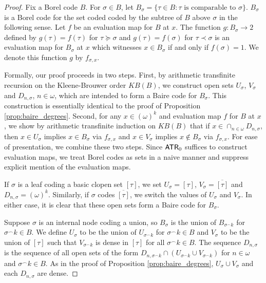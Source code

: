 \documentclass{amsart}
\theoremstyle{definition}
\theoremstyle{remark}
\newcommand{\system}[1]{\mbox{\fontfamily{cmss}\fontshape{n}\fontseries{m}%
    \selectfont#1}}
\newcommand{\ATR}{\system{ATR}\ensuremath{_0}}
\begin{document}
\begin{proof}
Fix a Borel code $B$. For $\sigma \in B$, let 
$B_{\sigma} = \{ \tau \in B : \tau \text{ is comparable to } \sigma \}$. $B_{\sigma}$ is a Borel code for the set coded coded by the subtree of $B$ above $\sigma$ in the 
following sense. Let $f$ be an evaluation map for $B$ at $x$. The function $g: B_{\sigma} \rightarrow 2$ defined by $g(\tau) = f(\tau)$ for $\tau \succeq \sigma$ and 
$g(\tau) = f(\sigma)$ for $\tau \prec \sigma$ is an evaluation map for $B_{\sigma}$ at $x$ which witnesses $x \in B_{\sigma}$ if and only if $f(\sigma) = 1$. We 
denote this function $g$ by $f_{\sigma,x}$. 

Formally, our proof proceeds in two steps. First, by arithmetic transfinite recursion on the Kleene-Brouwer order $KB(B)$, we construct 
open sets $U_{\sigma}$, $V_{\sigma}$ and $D_{n,\sigma}$, $n \in \omega$, which are intended to form a Baire code for $B_{\sigma}$. This construction is essentially identical 
to the proof of Proposition \ref{prop:baire_degrees}. Second, for any $x \in (\omega)^k$ 
and evaluation map $f$ for $B$ at $x$, we show by arithmetic transfinite induction on $KB(B)$ that if $x \in \cap_{n \in \omega} D_{n,\sigma}$, then $x \in U_{\sigma}$ implies 
$x \in B_{\sigma}$ via $f_{\sigma,x}$ and $x \in V_{\sigma}$ implies $x \not \in B_{\sigma}$ via $f_{\sigma,x}$. For ease of presentation, we combine these two steps.  
Since $\ATR$ suffices to construct evaluation maps, we treat Borel codes as sets in a naive manner and suppress explicit mention of the evaluation maps.

If $\sigma$ is a leaf coding a basic clopen set $[\tau]$, we set $U_{\sigma} = [\tau]$, $V_{\sigma} = \overline{[\tau]}$ and $D_{n,\sigma} = (\omega)^k$. 
Similarly, if $\sigma$ codes $\overline{[\tau]}$, we switch the values of $U_{\sigma}$ and $V_{\sigma}$. In either case, it is clear that these open sets form a 
Baire code for $B_{\sigma}$. 

Suppose $\sigma$ is an internal node coding a union, so $B_{\sigma}$ is the union of $B_{\sigma^{\smallfrown}k}$ for $\sigma^{\smallfrown}k \in B$. We define 
$U_{\sigma}$ to be the union of $U_{\sigma^{\smallfrown}k}$ for $\sigma^{\smallfrown}k \in B$ and $V_{\sigma}$ to be the union of $[\tau]$ such that 
$V_{\sigma^{\smallfrown}k}$ is dense in $[\tau]$ for all $\sigma^{\smallfrown}k \in B$. The sequence $D_{n,\sigma}$ is the sequence of all open sets of the 
form $D_{n,\sigma^{\smallfrown}k} \cap (U_{\sigma^{\smallfrown}k} \cup V_{\sigma^{\smallfrown}k})$ for $n \in \omega$ and $\sigma^{\smallfrown}k \in B$. 
As in the proof of Proposition \ref{prop:baire_degrees}, $U_{\sigma} \cup V_{\sigma}$ and each $D_{n,\sigma}$ are dense. 


\end{proof}
\end{document}
